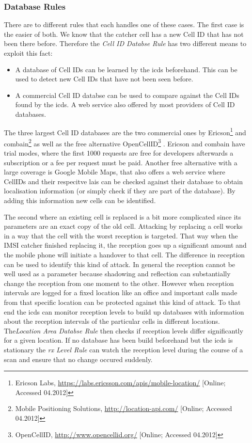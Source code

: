 \subsubsection{Database Rules}
There are to different rules that each handles one of these cases.
The first case is the easier of both.
We know that the catcher cell has a new Cell ID that has not been there before.
Therefore the \emph{Cell ID Databse Rule} has two different means to exploit this fact:
\begin{itemize}
	\item A database of Cell IDs can be learned by the \gls{icds} beforehand. 
	This can be used to detect new Cell IDs that have not been seen before.
	\item A commercial Cell ID databse can be used to compare against the Cell IDs found by the \gls{icds}.
	A web service also offered by most providers of Cell ID databases.
\end{itemize}
The three largest Cell ID databases are the two commercial ones by Ericson\footnote{Ericson Labs, \url{https://labs.ericsson.com/apis/mobile-location/} [Online; Accessed 04.2012]} and combain\footnote{Mobile Positioning Solutions, \url{http://location-api.com/} [Online; Accessed 04.2012]} as well as the free alternative OpenCellID\footnote{OpenCellID, \url{http://www.opencellid.org/} [Online; Accessed 04.2012]} \cite{wiki_cells}.
Ericson and combain have trial modes, where the first 1000 requests are free for developers afterwards a subscription or a fee per request must be paid.
Another free alternative with a large coverage is Google Mobile Maps, that also offers a web service where CellIDs and their respecitve \glspl{lai} can be checked against their database to obtain localisation information (or simply check if they are part of the database).
By adding this information new cells can be identified.

The second where an existing cell is replaced is a bit more complicated since its parameters are an exact copy of the old cell.
Attacking by replacing a cell works in a way that the cell with the worst reception is targeted.
That way when the IMSI catcher finished replacing it, the reception goes up a significant amount and the mobile phone will initiate a handover to that cell.
The difference in reception can be used to identify this kind of attack.
In general the reception cannot be well used as a parameter because shadowing and reflection can substantially change the reception from one moment to the other.
However when reception intervals are logged for a fixed location like an office and important calls made from that specific location can be protected against this kind of attack.
To that end the \gls{icds} can monitor reception levels to build up databases with information about the reception intervals of the particular cells in different locations.
The\emph{Location Area Databse Rule} then checks if reception levels differ significantly for a given location.
If no database has been build beforehand but the \gls{icds} is stationary the \emph{rx Level Rule} can watch the reception level during the course of a scan and ensure that no change occured suddenly.

